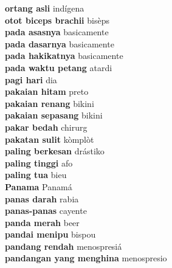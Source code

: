 \textbf{ ortang asli  } indígena \\
\textbf{ otot biceps brachii  } bisèps \\
\textbf{ pada asasnya  } basicamente \\
\textbf{ pada dasarnya  } basicamente \\
\textbf{ pada hakikatnya  } basicamente \\
\textbf{ pada waktu petang  } atardi \\
\textbf{ pagi hari  } dia \\
\textbf{ pakaian hitam  } preto \\
\textbf{ pakaian renang  } bikini \\
\textbf{ pakaian sepasang  } bikini \\
\textbf{ pakar bedah  } chirurg \\
\textbf{ pakatan sulit  } kòmplòt \\
\textbf{ paling berkesan  } drástiko \\
\textbf{ paling tinggi  } afo \\
\textbf{ paling tua  } bieu \\
\textbf{ Panama  } Panamá \\
\textbf{ panas darah  } rabia \\
\textbf{ panas-panas  } cayente \\
\textbf{ panda merah  } beer \\
\textbf{ pandai menipu  } bispou \\
\textbf{ pandang rendah  } menospresiá \\
\textbf{ pandangan yang menghina  } menospresio \\
